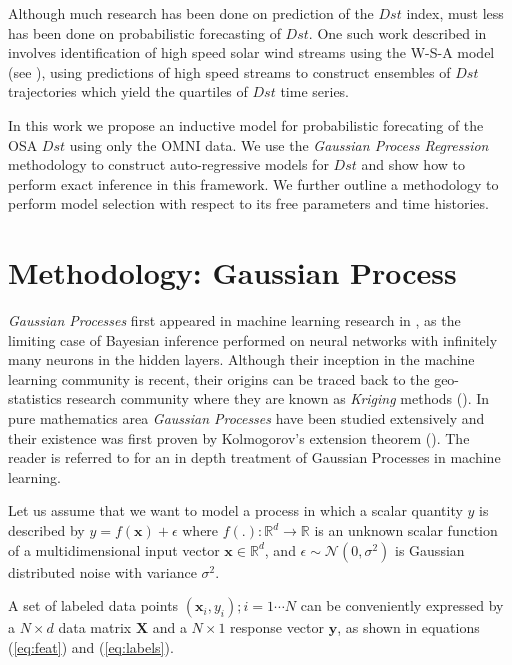 \documentclass[draft,sw]{AGUTeX}
\begin{document}
\begin{article}
Although much research has been done on prediction of the $Dst$ index, must less has been done on probabilistic forecasting of $Dst$. One such work described in \citet{McPherron:2013} involves identification of high speed solar wind streams using the W-S-A model (see \citet{WSAModel}), using predictions of high speed streams to construct ensembles of $Dst$ trajectories which yield the quartiles of $Dst$ time series.

In this work we propose an inductive model for probabilistic forecating of the OSA $Dst$ using only the OMNI data. We use the \emph{Gaussian Process Regression} methodology to construct auto-regressive models for $Dst$ and show how to perform exact inference in this framework. We further outline a methodology to perform model selection with respect to its free parameters and time histories.  


\section{Methodology: Gaussian Process} \label{sec:method}

\emph{Gaussian Processes} first appeared in machine learning research in \citet{Neal:1996:BLN:525544}, as the limiting case of Bayesian inference performed on neural networks with infinitely many neurons in the hidden layers. Although their inception in the machine learning community is recent, their origins can be traced back to the geo-statistics research community where they are known as \emph{Kriging} methods (\citet{krige1951statistical}). In pure mathematics area \emph{Gaussian Processes} have been studied extensively and their existence was first proven by Kolmogorov's extension theorem (\citet{tao2011introduction}). The reader is referred to \citet{Rasmussen:2005:GPM:1162254} for an in depth treatment of Gaussian Processes in machine learning.

Let us assume that we want to model a process in which a scalar quantity $y$ is described by $y = f(\mathbf{x}) + \epsilon$ where   $f(.): \mathbb{R}^d \rightarrow \mathbb{R}$ is an unknown scalar function of a multidimensional input vector $\mathbf{x} \in \mathbb{R}^d$, and $\epsilon \sim \mathcal{N}(0, \sigma^2)$ is Gaussian distributed noise with variance $\sigma^2$.

A set of labeled data points ${(\mathbf{x}_i, y_i); i = 1 \cdots N}$ can be conveniently expressed by a $N \times d$ data matrix $\mathbf{X}$ and a $N \times 1$ response vector $\mathbf{y}$, as shown in equations (\ref{eq:feat}) and (\ref{eq:labels}).


\end{article}
\end{document}
